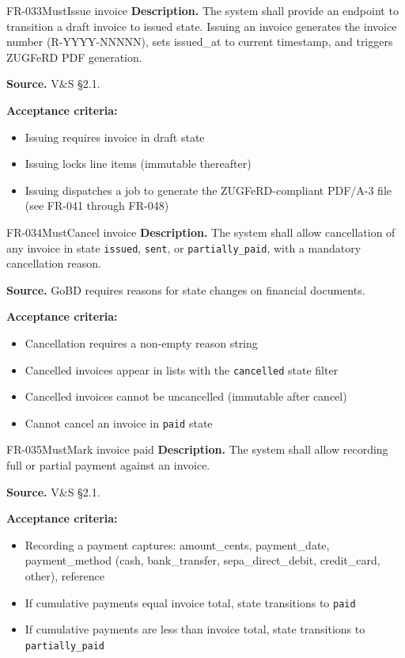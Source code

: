\documentclass[11pt,a4paper]{article}
\begin{document}
\begin{requirement}{FR-033}{Must}{Issue invoice}
\textbf{Description.} The system shall provide an endpoint to transition a draft invoice to issued state. Issuing an invoice generates the invoice number (R-YYYY-NNNNN), sets issued\_at to current timestamp, and triggers ZUGFeRD PDF generation.

\textbf{Source.} V\&S \S2.1.

\textbf{Acceptance criteria:}
\begin{itemize}
    \item Issuing requires invoice in draft state
    \item Issuing locks line items (immutable thereafter)
    \item Issuing dispatches a job to generate the ZUGFeRD-compliant PDF/A-3 file (see FR-041 through FR-048)
\end{itemize}
\end{requirement}

\begin{requirement}{FR-034}{Must}{Cancel invoice}
\textbf{Description.} The system shall allow cancellation of any invoice in state \texttt{issued}, \texttt{sent}, or \texttt{partially\_paid}, with a mandatory cancellation reason.

\textbf{Source.} GoBD requires reasons for state changes on financial documents.

\textbf{Acceptance criteria:}
\begin{itemize}
    \item Cancellation requires a non-empty reason string
    \item Cancelled invoices appear in lists with the \texttt{cancelled} state filter
    \item Cancelled invoices cannot be uncancelled (immutable after cancel)
    \item Cannot cancel an invoice in \texttt{paid} state
\end{itemize}
\end{requirement}

\begin{requirement}{FR-035}{Must}{Mark invoice paid}
\textbf{Description.} The system shall allow recording full or partial payment against an invoice.

\textbf{Source.} V\&S \S2.1.

\textbf{Acceptance criteria:}
\begin{itemize}
    \item Recording a payment captures: amount\_cents, payment\_date, payment\_method (cash, bank\_transfer, sepa\_direct\_debit, credit\_card, other), reference
    \item If cumulative payments equal invoice total, state transitions to \texttt{paid}
    \item If cumulative payments are less than invoice total, state transitions to \texttt{partially\_paid}
\end{itemize}
\end{requirement}
\end{document}
